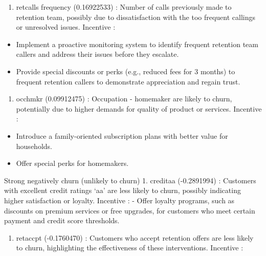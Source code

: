\documentclass[
]{article}
\providecommand{\tightlist}{%
  \setlength{\itemsep}{0pt}\setlength{\parskip}{0pt}}
\begin{document}
\begin{enumerate}
\def\labelenumi{\arabic{enumi}.}
\setcounter{enumi}{2}
\tightlist
\item
  retcalls frequency (0.16922533) : Number of calls previously made to
  retention team, possibly due to dissatisfaction with the too frequent
  callings or unresolved issues. Incentive :
\end{enumerate}

\begin{itemize}
\tightlist
\item
  Implement a proactive monitoring system to identify frequent retention
  team callers and address their issues before they escalate.
\item
  Provide special discounts or perks (e.g., reduced fees for 3 months)
  to frequent retention callers to demonstrate appreciation and regain
  trust.
\end{itemize}

\begin{enumerate}
\def\labelenumi{\arabic{enumi}.}
\setcounter{enumi}{3}
\tightlist
\item
  occhmkr (0.09912475) : Occupation - homemaker are likely to churn,
  potentially due to higher demands for quality of product or services.
  Incentive :
\end{enumerate}

\begin{itemize}
\tightlist
\item
  Introduce a family-oriented subscription plans with better value for
  households.
\item
  Offer special perks for homemakers.
\end{itemize}

Strong negatively churn (unlikely to churn) 1. creditaa (-0.2891994) :
Customers with excellent credit ratings `aa' are less likely to churn,
possibly indicating higher satisfaction or loyalty. Incentive : - Offer
loyalty programs, such as discounts on premium services or free
upgrades, for customers who meet certain payment and credit score
thresholds.

\begin{enumerate}
\def\labelenumi{\arabic{enumi}.}
\setcounter{enumi}{1}
\tightlist
\item
  retaccpt (-0.1760470) : Customers who accept retention offers are less
  likely to churn, highlighting the effectiveness of these
  interventions. Incentive :
\end{enumerate}
\end{document}
